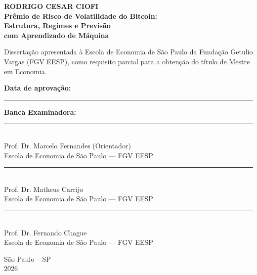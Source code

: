 
\begin{titlepage}
\begin{center}

{\Large \textbf{RODRIGO CESAR CIOFI}}\\[1.5cm]

{\Large \textbf{Prêmio de Risco de Volatilidade do Bitcoin:\\
Estrutura, Regimes e Previsão\\
com Aprendizado de Máquina}}\\[1.5cm]

\end{center}

\noindent
Dissertação apresentada à Escola de Economia de São Paulo da Fundação Getulio
Vargas (FGV EESP), como requisito parcial para a obtenção do título de Mestre
em Economia.

\vspace{1cm}

\noindent
\textbf{Data de aprovação:} \rule{4.5cm}{0.3pt}

\vspace{1.2cm}

\noindent
\textbf{Banca Examinadora:}

\vspace{1.2cm}

\noindent
\rule{13cm}{0.3pt}\\[0.3cm]
Prof. Dr. Marcelo Fernandes \hspace{0.5cm} (Orientador)\\
Escola de Economia de São Paulo — FGV EESP

\vspace{1.2cm}

\noindent
\rule{13cm}{0.3pt}\\[0.3cm]
Prof. Dr. Matheus Carrijo\\
Escola de Economia de São Paulo — FGV EESP

\vspace{1.2cm}

\noindent
\rule{13cm}{0.3pt}\\[0.3cm]
Prof. Dr. Fernando Chague\\
Escola de Economia de São Paulo — FGV EESP

\vfill

\begin{center}
São Paulo -- SP\\
2026
\end{center}

\end{titlepage}

